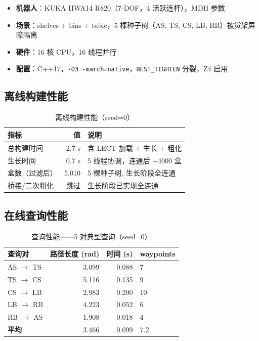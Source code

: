 \documentclass[11pt,a4paper]{article}
\begin{document}
\begin{itemize}[nosep]
  \item \textbf{机器人}：KUKA IIWA14 R820（7-DOF，4 活跃连杆），MDH 参数
  \item \textbf{场景}：shelves + bins + table，5 棵种子树（AS, TS, CS, LB, RB）被货架屏障隔离
  \item \textbf{硬件}：16 核 CPU，16 线程并行
  \item \textbf{配置}：C++17，\texttt{-O3 -march=native}，\texttt{BEST\_TIGHTEN} 分裂，Z4 启用
\end{itemize}

\subsection{离线构建性能}

\begin{table}[ht]
\centering
\caption{离线构建性能（seed=0）}
\label{tab:build}
\begin{tabular}{@{}lrl@{}}
\toprule
\textbf{指标} & \textbf{值} & \textbf{说明} \\
\midrule
总构建时间 & 2.7 s & 含 LECT 加载 + 生长 + 粗化 \\
生长时间 & 0.7 s & 5 线程协调，连通后 +4000 盒 \\
盒数（过滤后） & 5{,}010 & 5 棵种子树, 生长阶段全连通 \\
桥接/二次粗化 & 跳过 & 生长阶段已实现全连通 \\
\bottomrule
\end{tabular}
\end{table}

\subsection{在线查询性能}

\begin{table}[ht]
\centering
\caption{查询性能——5 对典型查询（seed=0）}
\label{tab:query}
\begin{tabular}{@{}lrrl@{}}
\toprule
\textbf{查询对} & \textbf{路径长度 (rad)} & \textbf{时间 (s)} & \textbf{waypoints} \\
\midrule
AS $\to$ TS & 3.099 & 0.088 & 7 \\
TS $\to$ CS & 5.116 & 0.135 & 9 \\
CS $\to$ LB & 2.983 & 0.200 & 10 \\
LB $\to$ RB & 4.223 & 0.052 & 6 \\
RB $\to$ AS & 1.908 & 0.018 & 4 \\
\midrule
\textbf{平均} & 3.466 & 0.099 & 7.2 \\
\bottomrule
\end{tabular}
\end{table}
\end{document}
